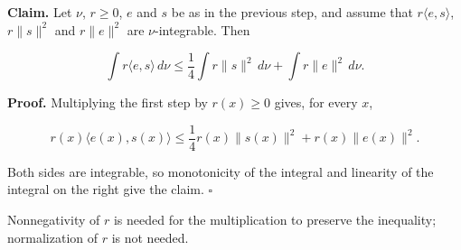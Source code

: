 \documentclass[11pt,a4paper]{report}
\begin{document}
\textbf{Claim.} Let \(\nu\), \(r\ge0\), \(e\) and \(s\) be as in the previous step, and assume that \(r\langle e,s\rangle\), \(r\|s\|^2\) and \(r\|e\|^2\) are \(\nu\)-integrable. Then


\[\int r\langle e,s\rangle\,d\nu\le\frac14\int r\|s\|^2\,d\nu+\int r\|e\|^2\,d\nu.\]


\textbf{Proof.} Multiplying the first step by \(r(x)\ge0\) gives, for every \(x\),


\[r(x)\langle e(x),s(x)\rangle\le\frac14r(x)\|s(x)\|^2+r(x)\|e(x)\|^2.\]


Both sides are integrable, so monotonicity of the integral and linearity of the integral on the right give the claim. \(\square\)




Nonnegativity of \(r\) is needed for the multiplication to preserve the inequality; normalization of \(r\) is not needed.
\end{document}
